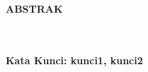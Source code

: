 \clearpage
{}%
\thispagestyle{fancy}

\begin{center}
	\large \bfseries \MakeUppercase{Abstrak}\\
	\normalsize \normalfont {\thetitle}\\
	\normalsize \normalfont {\theauthor}\\
	\bigskip
	
	\normalsize \normalfont \justifying \singlespacing
	\lipsum[1] %

    \vspace{20pt}
	\raggedright \textbf{Kata Kunci: kunci1, kunci2}
	
	\vfill
	
\end{center}
\clearpage